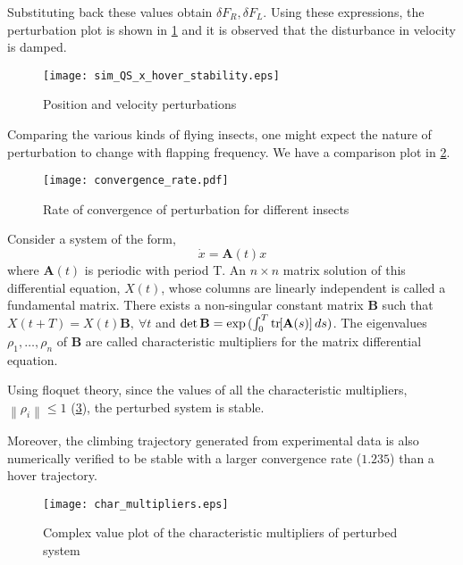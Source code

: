 \documentclass[10pt]{article}
\newcommand{\norm}[1]{\ensuremath{\left\| #1 \right\|}}
\newcommand{\bracket}[1]{\ensuremath{\left[ #1 \right]}}
\newcommand{\tr}[1]{\mathrm{tr}\ensuremath{\negthickspace\bracket{#1}}}
\begin{document}
Substituting back these values obtain $ \delta F_R, \delta F_L $. Using these expressions, the perturbation plot is shown in \cref{fig:pos_vel_pert} and it is observed that the disturbance in velocity is damped.

\begin{figure}[h]
	\centering
	\texttt{[image: sim\_QS\_x\_hover\_stability.eps]}
	\caption{Position and velocity perturbations}
	\label{fig:pos_vel_pert}
\end{figure}

Comparing the various kinds of flying insects, one might expect the nature of perturbation to change with flapping frequency. We have a comparison plot in \cref{fig:vel_damping}.

\begin{figure}[H]
	\centering
	\texttt{[image: convergence\_rate.pdf]}
	\caption{Rate of convergence of perturbation for different insects}
	\label{fig:vel_damping}
\end{figure}

Consider a system of the form,
\[ \dot{x} = \mathbf{A}(t) x\]
where $ \mathbf{A}(t) $ is periodic with period T. An $ n \times n $ matrix solution of this differential equation, $ X(t) $, whose columns are linearly independent is called a fundamental matrix. There exists a non-singular constant matrix $ \mathbf{B} $ such that $ X(t+T) = X(t)\mathbf{B},\ \forall t $ and $ \det{\mathbf{B}} =\exp{(\int_{0}^{T} \tr{\mathbf{A}(s)} ds)} $. The eigenvalues $ \rho_1, \dots, \rho_n $ of $ \mathbf{B} $ are called characteristic multipliers for the matrix differential equation.

Using floquet theory, since the values of all the characteristic multipliers, $ \norm{\rho_i} \le 1 $ (\cref{fig:char_multipliers}), the perturbed system is stable.

Moreover, the climbing trajectory generated from experimental data is also numerically verified to be stable with a larger convergence rate ($ 1.235 $) than a hover trajectory.

\begin{figure}[h!]
	\centering
	\texttt{[image: char\_multipliers.eps]}
	\caption{Complex value plot of the characteristic multipliers of perturbed system}
	\label{fig:char_multipliers}
\end{figure}
\end{document}
